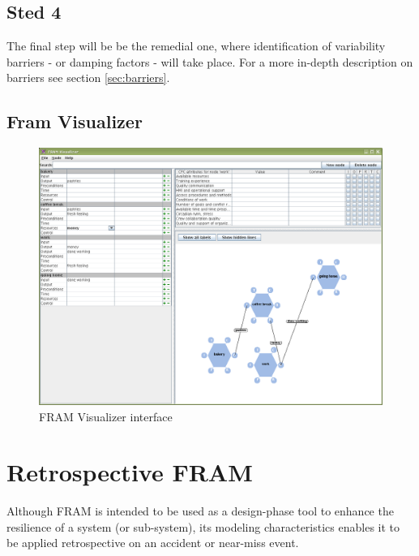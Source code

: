 \subsection*{Sted 4}
The final step will be be the remedial one, where identification of variability barriers - or damping factors - will take place. For a more in-depth description on barriers see section \ref{sec:barriers}.



\subsection{Fram Visualizer}


\begin{figure}
 \centering
   \includegraphics[width=320pt]{figures/framvisualizer1.png}
 \caption{FRAM Visualizer interface}
 \label{fig:fram_visualizer_interface}
\end{figure}

\section{Retrospective FRAM}
Although FRAM is intended to be used as a design-phase tool to enhance the resilience of a system (or sub-system), its modeling characteristics enables it to be applied retrospective on an accident or near-miss event.



